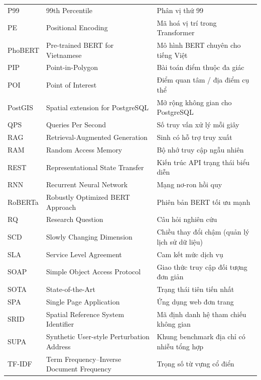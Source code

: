 \begin{longtable}{p{2.4cm} p{5.4cm} p{6.6cm}}
P99         & 99th Percentile                        & Phân vị thứ 99 \\
PE          & Positional Encoding                    & Mã hoá vị trí trong Transformer \\
PhoBERT     & Pre-trained BERT for Vietnamese        & Mô hình BERT chuyên cho tiếng Việt \\
PIP         & Point-in-Polygon                       & Bài toán điểm thuộc đa giác \\
POI         & Point of Interest                      & Điểm quan tâm / địa điểm cụ thể \\
PostGIS     & Spatial extension for PostgreSQL       & Mở rộng không gian cho PostgreSQL \\
QPS         & Queries Per Second                     & Số truy vấn xử lý mỗi giây \\
RAG         & Retrieval-Augmented Generation         & Sinh có hỗ trợ truy xuất \\
RAM         & Random Access Memory                   & Bộ nhớ truy cập ngẫu nhiên \\
REST        & Representational State Transfer        & Kiến trúc API trạng thái biểu diễn \\
RNN         & Recurrent Neural Network               & Mạng nơ-ron hồi quy \\
RoBERTa     & Robustly Optimized BERT Approach       & Phiên bản BERT tối ưu mạnh \\
RQ          & Research Question                      & Câu hỏi nghiên cứu \\
SCD         & Slowly Changing Dimension              & Chiều thay đổi chậm (quản lý lịch sử dữ liệu) \\
SLA         & Service Level Agreement                & Cam kết mức dịch vụ \\
SOAP        & Simple Object Access Protocol          & Giao thức truy cập đối tượng đơn giản \\
SOTA        & State-of-the-Art                       & Trạng thái tiên tiến nhất \\
SPA         & Single Page Application                & Ứng dụng web đơn trang \\
SRID        & Spatial Reference System Identifier    & Mã định danh hệ tham chiếu không gian \\
SUPA        & Synthetic User-style Perturbation Address & Khung benchmark địa chỉ có nhiễu tổng hợp \\
TF-IDF      & Term Frequency--Inverse Document Frequency & Trọng số từ vựng cổ điển \\

\end{longtable}
